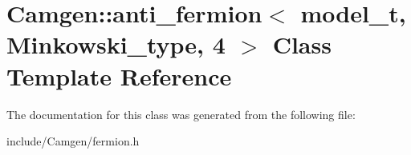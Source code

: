 \hypertarget{a00008}{\section{Camgen\-:\-:anti\-\_\-fermion$<$ model\-\_\-t, Minkowski\-\_\-type, 4 $>$ Class Template Reference}
\label{a00008}
}


The documentation for this class was generated from the following file\-:\begin{DoxyCompactItemize}
\item 
include/\-Camgen/fermion.\-h\end{DoxyCompactItemize}
